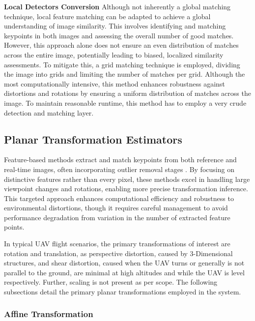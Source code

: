 \textbf{Local Detectors Conversion}
Although not inherently a global matching technique, local feature matching can be adapted to achieve a global understanding of image similarity. This involves identifying and matching keypoints in both images and assessing the overall number of good matches. However, this approach alone does not ensure an even distribution of matches across the entire image, potentially leading to biased, localized similarity assessments. To mitigate this, a grid matching technique is employed, dividing the image into grids and limiting the number of matches per grid. Although the most computationally intensive, this method enhances robustness against distortions and rotations by ensuring a uniform distribution of matches across the image. To maintain reasonable runtime, this method has to employ a very crude detection and matching layer. 





\subsection{Planar Transformation Estimators}

Feature-based methods extract and match keypoints from both reference and real-time images, often incorporating outlier removal stages \cite{GlobalLocal2023}. By focusing on distinctive features rather than every pixel, these methods excel in handling large viewpoint changes and rotations, enabling more precise transformation inference. This targeted approach enhances computational efficiency and robustness to environmental distortions, though it requires careful management to avoid performance degradation from variation in the number of extracted feature points. 

In typical UAV flight scenarios, the primary transformations of interest are rotation and translation, as perspective distortion, caused by 3-Dimensional structures, and shear distortion, caused when the UAV turns or generally is not parallel to the ground, are minimal at high altitudes and while the UAV is level respectively. Further, scaling is not present as per scope. The following subsections detail the primary planar transformations employed in the system.

\subsubsection{Affine Transformation}

